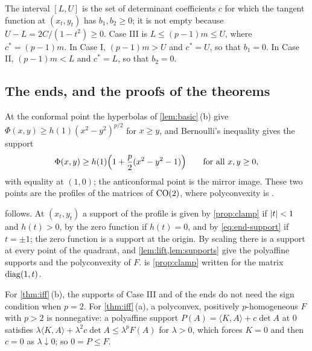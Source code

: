 The interval $[L,U]$ is the set of determinant coefficients $c$ for which the tangent function
at $(x_t,y_t)$ has $b_1,b_2\ge0$; it is not empty because $U-L=2C/(1-t^2)\ge0$. Case III is
$L\le(p-1)m\le U$, where $c^\ast=(p-1)m$. In Case I, $(p-1)m>U$ and $c^\ast=U$, so that
$b_1=0$. In Case II, $(p-1)m<L$ and $c^\ast=L$, so that $b_2=0$.

\subsection{The ends, and the proofs of the theorems}\label{sec:proofs-pge2}

At the conformal point the hyperbolas of \cref{lem:basic}\,(b) give
$\Phi(x,y)\ge h(1)(x^2-y^2)^{p/2}$ for $x\ge y$, and Bernoulli's inequality gives the support
\begin{equation}\label{eq:end-support}
  \Phi(x,y)\ge h(1)\Bigl(1+\frac p2(x^2-y^2-1)\Bigr)\qquad\text{for all }x,y\ge0,
\end{equation}
with equality at $(1,0)$; the anticonformal point is the mirror image. These two points are the
profiles of the matrices of $\mathrm{CO}(2)$, where polyconvexity is
\cite[Theorem~1.3]{GuerraKristensen2022}.

 follows. At $(x_t,y_t)$ a support of the profile is given by \cref{prop:clamp}
if $\lvert t\rvert<1$ and $h(t)>0$, by the zero function if $h(t)=0$, and by \eqref{eq:end-support} if
$t=\pm1$; the zero function is a support at the origin. By scaling there is a support at every
point of the quadrant, and \cref{lem:lift,lem:supports} give the polyaffine supports and the
polyconvexity of $F$.  is \cref{prop:clamp} written for the matrix
$\operatorname{diag}(1,t)$.

For \cref{thm:iff}\,(b), the supports of Case III and of the ends do not need the sign
condition when $p=2$. For \cref{thm:iff}\,(a), a polyconvex, positively $p$-homogeneous $F$ with
$p>2$ is nonnegative: a polyaffine support $P(A)=\langle K,A\rangle+c\det A$ at $0$ satisfies
$\lambda\langle K,A\rangle+\lambda^2c\det A\le\lambda^pF(A)$ for $\lambda>0$, which forces
$K=0$ and then $c=0$ as $\lambda\downarrow0$; so $0=P\le F$.
